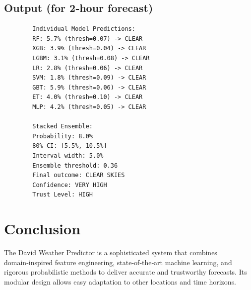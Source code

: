 \documentclass[12pt]{article}
\begin{document}
	\subsection*{Output (for 2‑hour forecast)}
	\begin{lstlisting}
		Individual Model Predictions:
		RF: 5.7% (thresh=0.07) -> CLEAR
		XGB: 3.9% (thresh=0.04) -> CLEAR
		LGBM: 3.1% (thresh=0.08) -> CLEAR
		LR: 2.8% (thresh=0.06) -> CLEAR
		SVM: 1.8% (thresh=0.09) -> CLEAR
		GBT: 5.9% (thresh=0.06) -> CLEAR
		ET: 4.0% (thresh=0.10) -> CLEAR
		MLP: 4.2% (thresh=0.05) -> CLEAR
		
		Stacked Ensemble:
		Probability: 8.0%
		80% CI: [5.5%, 10.5%]
		Interval width: 5.0%
		Ensemble threshold: 0.36
		Final outcome: CLEAR SKIES
		Confidence: VERY HIGH
		Trust Level: HIGH
	\end{lstlisting}
	
	\section{Conclusion}
	The David Weather Predictor is a sophisticated system that combines domain‑inspired feature engineering, state‑of‑the‑art machine learning, and rigorous probabilistic methods to deliver accurate and trustworthy forecasts. Its modular design allows easy adaptation to other locations and time horizons.
	
\end{document}
